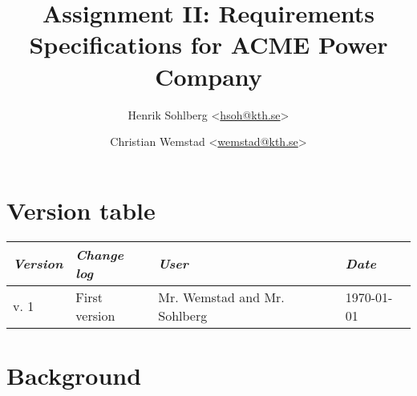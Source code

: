 \documentclass[a4paper]{article}
\title{Assignment II: Requirements Specifications for ACME Power Company}
\author{Henrik Sohlberg <\href{mailto:hsoh@kth.se}{hsoh@kth.se}> %
\and Christian Wemstad <\href{mailto:wemstad@kth.se}{wemstad@kth.se}> %
}
\begin{document}
\thispagestyle{empty}
\maketitle
\thispagestyle{empty}
\pagestyle{empty}
\newpage
\section*{Version table}
\label{sec:version_tabel}
\begin{table}[H]
	\centering
	\begin{tabular}{|l|l|l|l|}
		\hline
			\textit{Version} & \textit{Change log} & \textit{User} & \textit{Date}\\
		\hline
		     v. 1 & First version & Mr. Wemstad and Mr. Sohlberg & \today \\
		\hline
	\end{tabular}
\end{table}
\newpage       
\tableofcontents
\newpage
\pagestyle{fancy}
\setcounter{page}{1}
\section{Background}



\begin{thebibliography}{99}     
	


\end{thebibliography}
\clearpage
\appendix
%
\end{document}
